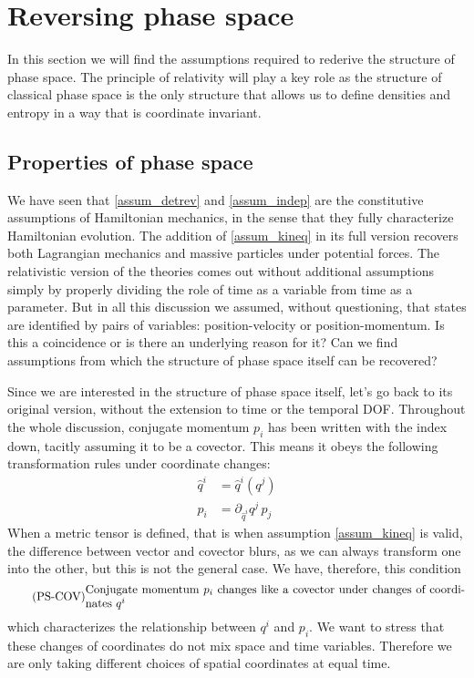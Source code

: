 \section{Reversing phase space}

In this section we will find the assumptions required to rederive the structure of phase space. The principle of relativity will play a key role as the structure of classical phase space is the only structure that allows us to define densities and entropy in a way that is coordinate invariant.


\subsection{Properties of phase space}

We have seen that \ref{assum_detrev} and \ref{assum_indep} are the constitutive assumptions of Hamiltonian mechanics, in the sense that they fully characterize Hamiltonian evolution. The addition of \ref{assum_kineq} in its full version recovers both Lagrangian mechanics and massive particles under potential forces. The relativistic version of the theories comes out without additional assumptions simply by properly dividing the role of time as a variable from time as a parameter. But in all this discussion we assumed, without questioning, that states are identified by pairs of variables: position-velocity or position-momentum. Is this a coincidence or is there an underlying reason for it? Can we find assumptions from which the structure of phase space itself can be recovered?

Since we are interested in the structure of phase space itself, let's go back to its original version, without the extension to time or the temporal DOF. Throughout the whole discussion, conjugate momentum $p_i$ has been written with the index down, tacitly assuming it to be a covector. This means it obeys the following transformation rules under coordinate changes:
\begin{equation}
	\begin{aligned}
 \hat{q}^i &= \hat{q}^i(q^j) \\
 \hat{p}_i &= \partial_{\hat{q}^i} q^j  \, p_j
	\end{aligned}
\end{equation}
When a metric tensor is defined, that is when assumption \ref{assum_kineq} is valid, the difference between vector and covector blurs, as we can always transform one into the other, but this is not the general case. We have, therefore, this condition
\begin{equation}
	\tag{PS-COV}\label{rp-cm-ps-condMomentumCovector}
	\eqtext{Conjugate momentum $p_i$ changes like a covector under changes of coordinates $q^i$}
\end{equation}
which characterizes the relationship between $q^i$ and $p_i$. We want to stress that these changes of coordinates do not mix space and time variables. Therefore we are only taking different choices of spatial coordinates at equal time.

